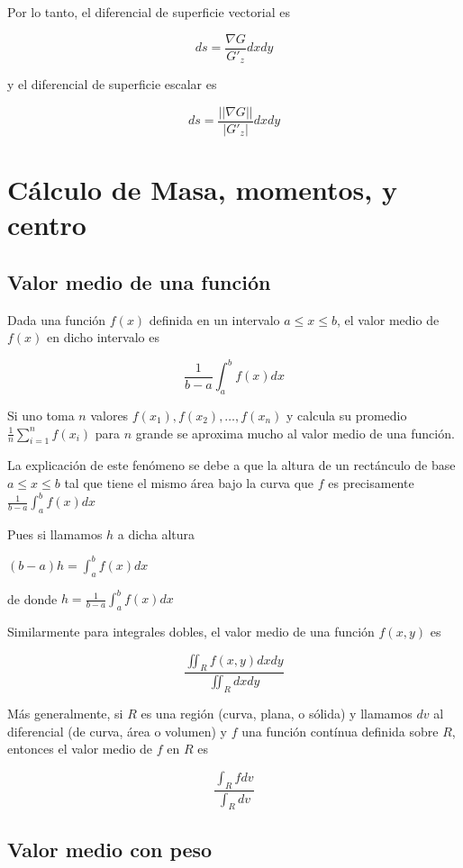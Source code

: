 Por lo tanto, el diferencial de superficie vectorial es

$$ ds = \frac{\nabla G}{G'_z}dxdy $$

y el diferencial de superficie escalar es

$$ ds = \frac{||\nabla G||}{|G'_z|}dxdy $$



\chapter{Cálculo de Masa, momentos, y centro}

\section{Valor medio de una función}

Dada una función $f(x)$ definida en un intervalo $a \leq x \leq b$, el valor medio de $f(x)$ en dicho intervalo es

$$ \frac{1}{b-a} \int_a^b f(x) dx $$

Si uno toma $n$ valores $f(x_1), f(x_2), \ldots, f(x_n)$ y calcula su promedio $\frac{1}{n} \sum_{i=1}^n f(x_i)$ para $n$ grande se aproxima mucho al valor medio de una función.

La explicación de este fenómeno se debe a que la altura de un rectánculo de base $a \leq x \leq b$ tal que tiene el mismo área bajo la curva que $f$ es precisamente $ \frac{1}{b-a} \int_a^b f(x) dx$

Pues si llamamos $h$ a dicha altura

$(b-a) h = \int_a^b f(x) dx$

de donde $ h = \frac{1}{b-a} \int_a^b f(x) dx$

Similarmente para integrales dobles, el valor medio de una función $f(x,y)$ es

$$ \frac{\iint_R f(x,y) dxdy}{ \iint_R dxdy }$$

Más generalmente, si $R$ es una región (curva, plana, o sólida) y llamamos $dv$ al diferencial (de curva, área o volumen) y $f$ una función contínua definida sobre $R$, entonces el valor medio de $f$ en $R$ es

$$ \frac{ \int_R f dv }{ \int_R dv }  $$

\section{Valor medio con peso}

